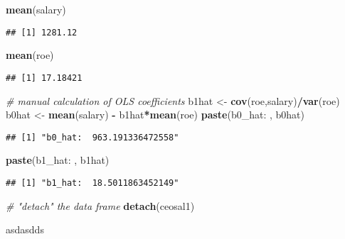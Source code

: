 \documentclass[
]{article}
\newenvironment{Shaded}{\begin{snugshade}}{\end{snugshade}}
\newcommand{\CommentTok}[1]{\textcolor[rgb]{0.56,0.35,0.01}{\textit{#1}}}
\newcommand{\FunctionTok}[1]{\textcolor[rgb]{0.13,0.29,0.53}{\textbf{#1}}}
\newcommand{\NormalTok}[1]{#1}
\newcommand{\OtherTok}[1]{\textcolor[rgb]{0.56,0.35,0.01}{#1}}
\newcommand{\SpecialCharTok}[1]{\textcolor[rgb]{0.81,0.36,0.00}{\textbf{#1}}}
\newcommand{\StringTok}[1]{\textcolor[rgb]{0.31,0.60,0.02}{#1}}
\begin{document}
\begin{Shaded}
\begin{Highlighting}[]
\FunctionTok{mean}\NormalTok{(salary)}
\end{Highlighting}
\end{Shaded}

\begin{verbatim}
## [1] 1281.12
\end{verbatim}

\begin{Shaded}
\begin{Highlighting}[]
\FunctionTok{mean}\NormalTok{(roe)}
\end{Highlighting}
\end{Shaded}

\begin{verbatim}
## [1] 17.18421
\end{verbatim}

\begin{Shaded}
\begin{Highlighting}[]
\CommentTok{\# manual calculation of OLS coefficients}
\NormalTok{b1hat }\OtherTok{\textless{}{-}} \FunctionTok{cov}\NormalTok{(roe,salary)}\SpecialCharTok{/}\FunctionTok{var}\NormalTok{(roe)}
\NormalTok{b0hat }\OtherTok{\textless{}{-}} \FunctionTok{mean}\NormalTok{(salary) }\SpecialCharTok{{-}}\NormalTok{ b1hat}\SpecialCharTok{*}\FunctionTok{mean}\NormalTok{(roe) }
\FunctionTok{paste}\NormalTok{(}\StringTok{\textquotesingle{}b0\_hat: \textquotesingle{}}\NormalTok{, b0hat)}
\end{Highlighting}
\end{Shaded}

\begin{verbatim}
## [1] "b0_hat:  963.191336472558"
\end{verbatim}

\begin{Shaded}
\begin{Highlighting}[]
\FunctionTok{paste}\NormalTok{(}\StringTok{\textquotesingle{}b1\_hat: \textquotesingle{}}\NormalTok{, b1hat)}
\end{Highlighting}
\end{Shaded}

\begin{verbatim}
## [1] "b1_hat:  18.5011863452149"
\end{verbatim}

\begin{Shaded}
\begin{Highlighting}[]
\CommentTok{\# "detach" the data frame}
\FunctionTok{detach}\NormalTok{(ceosal1)}
\end{Highlighting}
\end{Shaded}

asdasdds
\end{document}
